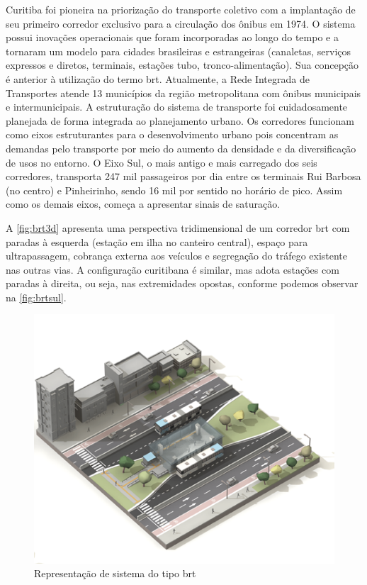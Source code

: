 	\begin{citacao}
		Curitiba foi pioneira na priorização do transporte coletivo com a implantação de seu primeiro corredor exclusivo para a circulação dos ônibus em 1974. O sistema possui inovações operacionais que foram incorporadas ao longo do tempo e a tornaram um modelo para cidades brasileiras e estrangeiras (canaletas, serviços expressos e diretos, terminais, estações tubo, tronco-alimentação). Sua concepção é anterior à utilização do termo \gls{brt}. Atualmente, a Rede Integrada de Transportes atende 13 municípios da região metropolitana com ônibus municipais e intermunicipais. A estruturação do sistema de transporte foi cuidadosamente planejada de forma integrada ao planejamento urbano. Os corredores funcionam como eixos estruturantes para o desenvolvimento urbano pois concentram as demandas pelo transporte por meio do aumento da densidade e da diversificação de usos no entorno.	O Eixo Sul, o mais antigo e mais carregado dos seis corredores, transporta 247 mil 	passageiros por dia entre os terminais Rui Barbosa (no centro) e Pinheirinho, sendo 16 mil por sentido no horário de pico. Assim como os demais eixos, começa a apresentar sinais de saturação. \cite[p. 42]{guia2015a}
	\end{citacao}

	A \autoref{fig:brt3d} apresenta uma perspectiva tridimensional de um corredor \gls{brt} com paradas à esquerda (estação em ilha no canteiro central), espaço para ultrapassagem, cobrança externa aos veículos e segregação do tráfego existente nas outras vias. A configuração curitibana é similar, mas adota estações com paradas à direita, ou seja, nas extremidades opostas, conforme podemos observar na \autoref{fig:brtsul}.
	
	\begin{figure}
		\centering
		\caption{Representação de sistema do tipo \glsdesc{brt}}
		\label{fig:brt3d}
		\includegraphics[width=0.65\linewidth]{img/guiatpc2018a_01}
	\end{figure}
	
